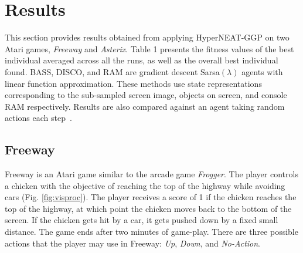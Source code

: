 \documentclass{acm_proc_article-sp}
\begin{document}
\section{Results}
\label{sec:results}
This section provides results obtained from applying HyperNEAT-GGP on two Atari games, \textit{Freeway} and \textit{Asterix}. Table 1 presents the fitness values of the best individual averaged across all the runs, as well as the overall best individual found. BASS, DISCO, and RAM are gradient descent Sarsa$(\lambda)$ agents with linear function approximation. These methods use state representations corresponding to the sub-sampled screen image, objects on screen, and console RAM respectively. Results are also compared against an agent taking random actions each step~\cite{naddaf10}. 

\subsection {Freeway}

Freeway is an Atari game similar to the arcade game \textit{Frogger}. The player controls a chicken with the objective of reaching the top of the highway while avoiding cars (Fig. \ref{fig:visproc}). The player receives a score of 1 if the chicken reaches the top of the highway, at which point the chicken moves back to the bottom of the screen. If the chicken gets hit by a car, it gets pushed down by a fixed small distance. The game ends after two minutes of game-play. There are three possible actions that the player may use in Freeway: \textit{Up}, \textit{Down}, and \textit{No-Action}.
\end{document}
